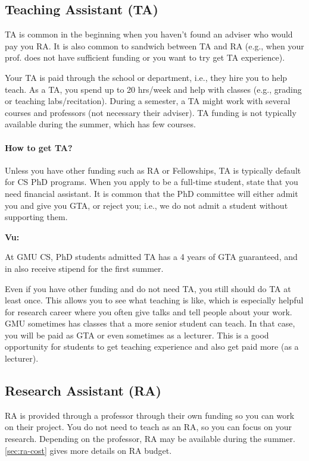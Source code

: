 \documentclass[oneside,11pt]{book}
\newenvironment{commentbox}[1][]{
  \small
  \begin{mybox}
    {\small \textbf{#1}}
  }{
  \end{mybox}
}
\begin{document}
\subsection{Teaching Assistant (TA)}\label{sec:ta}

TA is common in the beginning when you haven't found an adviser who would pay you RA. It is also common to sandwich between TA and RA (e.g., when your prof. does not have sufficient funding or you want to try get TA experience).

Your TA is paid through the school or department, i.e., they hire you to help teach.
As a TA, you spend up to 20 hrs/week and help with classes (e.g., grading or teaching labs/recitation).
During a semester, a TA might work with several courses and professors (not necessary their adviser).  TA funding is not typically available during the summer, which has few courses.

\paragraph{How to get TA?}  Unless you have other funding such as RA or Fellowships, TA is typically default for CS PhD programs. When you apply to be a full-time student,  state that you need financial assistant. It is common that the PhD committee will either admit you and give you GTA, or reject you; i.e., we do not admit a student without supporting them.  

\begin{commentbox}[Vu:]
  At GMU CS, PhD students admitted TA has a 4 years of GTA guaranteed, and in also receive  stipend for the first summer.
\end{commentbox}

Even if you have other funding and do not need TA, you still should do TA at least once.  This allows you to see what teaching is like, which is especially helpful for research career where you often give talks and tell people about your work. GMU sometimes has classes that a more senior student can teach.  In that case, you will be paid as GTA or even sometimes as a lecturer.  This is a good opportunity for students to get teaching experience and also get paid more (as a lecturer).

\subsection{Research Assistant (RA)}\label{sec:ra}
RA is provided through a professor through their own funding so you can work on their project.  
You do not need to teach as an RA, so you can focus on your research. Depending on the professor, RA may be available during the summer. \autoref{sec:ra-cost} gives more details on RA budget.
\end{document}
